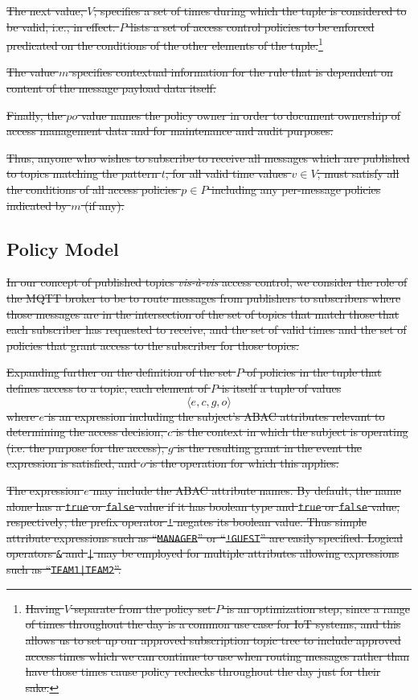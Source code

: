 \documentclass[sigconf, nonacm]{acmart}
\newcommand\tuple[1]{\langle#1\rangle}
\begin{document}
\sout{The next value, $V$, specifies a set of times during which
the tuple is considered to be valid, i.e., in effect. $P$ lists a set of access control policies to be enforced predicated on the conditions of the other elements
of the tuple.}\footnote{\sout{Having $V$ separate from the policy set $P$ is an optimization step, since a range of times throughout the day is a common use case for IoT systems, and this allows us to set up our approved subscription topic tree to include approved access times which we can continue to use when routing messages rather than have those times cause policy rechecks throughout the day just for their sake.}}

\sout{The value $m$ specifies contextual information for the rule that is dependent on content of the message payload data itself.}

\sout{Finally, the $po$ value names the policy owner in order to document ownership of access management data and for maintenance and audit purposes.}

\sout{Thus, anyone who wishes to subscribe to receive all messages which are published to topics matching the pattern $t$, for all valid time values $v\in V$, must satisfy all the conditions of all access policies $p\in P$ including any per-message policies indicated by $m$ (if any).}

\subsection{Policy Model}
\sout{In our concept of published topics \emph{vis-\`a-vis} access control, we 
consider the role of the MQTT broker to be to route messages from publishers to subscribers where those messages are in the intersection of the set of topics that match those that each subscriber has requested to receive, and the set of valid times and the set of policies that grant access to the subscriber for those topics.}

\sout{Expanding further on the definition of the set $P$ of policies in the tuple that defines access to a topic, each element of $P$ is itself a tuple of values} $$\tuple{e,c,g,o}$$ \sout{where $e$ is an expression including the subject's ABAC attributes relevant to determining the access decision, $c$ is the context in which the subject is operating (i.e.
the purpose for the access), $g$ is the resulting grant in the event
the expression is satisfied, and $o$ is the operation for which this
applies.}

\sout{The expression $e$ may include the ABAC attribute names. By default, the name alone has a {\tt true} or {\tt false} value if it has boolean type and {\tt true} or {\tt false} value, respectively; the prefix operator {\tt !} negates its boolean value. Thus simple attribute expressions such as ``{\tt MANAGER}'' or ``{\tt !GUEST}'' are easily specified. Logical operators {\tt\&} and {\tt|} may be employed for multiple attributes allowing expressions such as ``{\tt TEAM1|TEAM2}''.}
\end{document}
